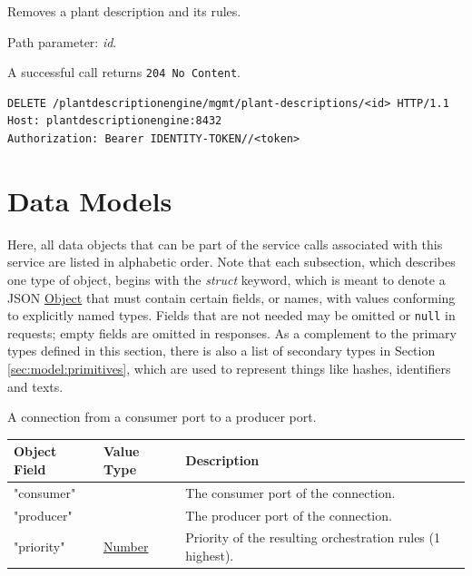 \documentclass[a4paper]{arrowhead}
\newcommand{\fparam}[1]{\textit{\textcolor{ArrowheadBlue}{#1}}}
\newcommand{\mref}[2][]{{\textcolor{ArrowheadPurple}{\hyperref[sec:model:#2]{\ifstrempty{#1}{#2}{#1}}}}}
\newcommand{\oref}[1]{{\textcolor{ArrowheadBlue}{\hyperref[sec:operations:#1]{#1}}}}
\newcommand{\pref}[1]{{\textcolor{ArrowheadGrey}{\hyperref[sec:model:primitives:#1]{#1}}}}
\begin{document}
Removes a plant description and its rules.

Path parameter: \fparam{id}.

A successful call returns \texttt{204 No Content}.

\begin{lstlisting}[label={lst:remove},caption={An \oref{remove} invocation.}]
DELETE /plantdescriptionengine/mgmt/plant-descriptions/<id> HTTP/1.1
Host: plantdescriptionengine:8432
Authorization: Bearer IDENTITY-TOKEN//<token>
\end{lstlisting}

\newpage

\section{Data Models}
\label{sec:model}

Here, all data objects that can be part of the service calls associated with this service are listed in alphabetic order.
Note that each subsection, which describes one type of object, begins with the \textit{struct} keyword, which is meant to denote a JSON \pref{Object} that must contain certain fields, or names, with values conforming to explicitly named types.
Fields that are not needed may be omitted or \texttt{null} in requests; empty fields are omitted in responses.
As a complement to the primary types defined in this section, there is also a list of secondary types in Section \ref{sec:model:primitives}, which are used to represent things like hashes, identifiers and texts.


A connection from a consumer port to a producer port.


\noindent\begin{tabularx}{\textwidth}{| >{\raggedright\arraybackslash}p{3.9cm} | >{\raggedright\arraybackslash\small}p{5.3cm} | X |} \hline
\rowcolor{gray!33} Object Field & Value Type & Description \\ \hline
"consumer" & \mref{SystemPort} & The consumer port of the connection. \\ \hline
"producer" & \mref{SystemPort} & The producer port of the connection. \\ \hline
"priority" & \pref{Number} & Priority of the resulting orchestration rules (1 highest). \\ \hline
\end{tabularx}
\end{document}
